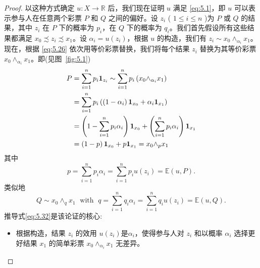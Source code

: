 \begin{proof}
以这种方式确定 \(u : X \rightarrow  \mathbb{R}\) 后，我们现在证明 \(u\) 满足 \eqref{eq:5.1}，即 \(u\) 可以表示参与人在任意两个彩票 \(P\) 和 \(Q\) 之间的偏好。设 \({z}_{i}\) ( \(1 \leq  i \leq  n\) )为 \(P\) 或 \(Q\) 的结果，其中 \({z}_{i}\) 在 \(P\) 下的概率为 \({p}_{i}\)，在 \(Q\) 下的概率为 \({q}_{i}\)。我们首先假设所有这些结果都满足 \({x}_{0} \precsim  {z}_{i} \precsim  {x}_{1}\)。设 \({\alpha }_{i} = u\left( {z}_{i}\right)\)，根据 \(u\) 的构造，我们有 \({z}_{i} \sim  {x}_{0}{ \land  }_{{\alpha }_{i}}{x}_{1}\)。现在，根据 \eqref{eq:5.26} 依次用等价彩票替换，我们将每个结果 \({z}_{i}\) 替换为其等价彩票 \({x}_{0}{ \land  }_{{\alpha }_{i}}{x}_{1}\)。即(见图~\ref{fig:5.1})
\begin{align}
P &= \mathop{\sum }\limits_{{i = 1}}^{n}{p}_{i}{\mathbf{1}}_{{z}_{i}} \sim  \mathop{\sum }\limits_{{i = 1}}^{n}{p}_{i}\left( {{x}_{0}{ \land  }_{{\alpha }_{i}}{x}_{1}}\right) \notag \\
&= \mathop{\sum }\limits_{{i = 1}}^{n}{p}_{i}\left( {\left( {1 - {\alpha }_{i}}\right) {\mathbf{1}}_{{x}_{0}} + {\alpha }_{i}{\mathbf{1}}_{{x}_{1}}}\right) \notag \\
&= \left( {1 - \mathop{\sum }\limits_{{i = 1}}^{n}{p}_{i}{\alpha }_{i}}\right) {\mathbf{1}}_{{x}_{0}} + \left( {\mathop{\sum }\limits_{{i = 1}}^{n}{p}_{i}{\alpha }_{i}}\right) {\mathbf{1}}_{{x}_{1}} \notag \\
&= \left( {1 - p}\right) {\mathbf{1}}_{{x}_{0}} + p{\mathbf{1}}_{{x}_{1}} = {x}_{0}{ \land  }_{p}{x}_{1}\label{eq:5.32}
\end{align}
其中
\begin{equation}
\label{eq:5.33}
p = \mathop{\sum }\limits_{{i = 1}}^{n}{p}_{i}{\alpha }_{i} = \mathop{\sum }\limits_{{i = 1}}^{n}{p}_{i}u\left( {z}_{i}\right)  = \mathbb{E}\left( {u,P}\right) .
\end{equation}
类似地
\begin{equation}
\label{eq:5.34}
Q \sim  {x}_{0}{ \land  }_{q}{x}_{1}\;\text{ with }\;q = \mathop{\sum }\limits_{{i = 1}}^{n}{q}_{i}{\alpha }_{i} = \mathop{\sum }\limits_{{i = 1}}^{n}{q}_{i}u\left( {z}_{i}\right)  = \mathbb{E}\left( {u,Q}\right) .
\end{equation}
推导式\eqref{eq:5.32}是该论证的核心:
\begin{itemize}
\item 根据构造，结果 \({z}_{i}\) 的效用 \(u\left( {z}_{i}\right)\)是\({\alpha }_{i}\)，使得参与人对 \({z}_{i}\) 和以概率 \({\alpha }_{i}\) 选择更好结果 \({x}_{1}\) 的简单彩票 \({x}_{0}{ \land  }_{{\alpha }_{i}}{x}_{1}\) 无差异。


\end{itemize}
\end{proof}
